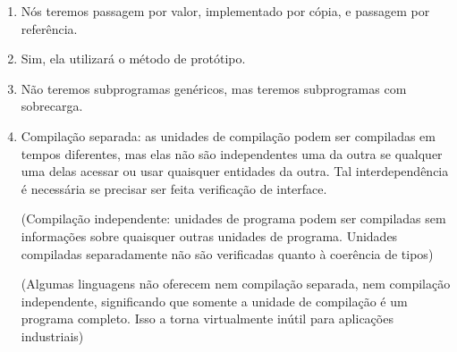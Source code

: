 \documentclass[12pt, a4paper]{article}
\begin{document}
\begin{enumerate}
        \item
        Nós teremos passagem por valor, implementado por cópia, e passagem por referência.

        \item
        Sim, ela utilizará o método de protótipo.

        \item
        Não teremos subprogramas genéricos, mas teremos subprogramas com sobrecarga.

        \begin{comment}
            Com sobrecarga:
            int soma(int a, int b) {
                return a+b;
            }

            float soma(float a, float b) {
                return a+b;
            }

            int soma(String a, String b) {
                return a^b;
            }

            Final das contas, posso lembrar o nome de apenas uma função e fazer:

            soma(1, 2);
            soma(1.5, 2.5);
            soma(“teste”, “ ftw”);

            Sem sobrecarga:

            int somaInt(int a, int b) {
                return a+b;
            }

            float somaFloat(float a, float b) {
                return a+b;
            }

            int somaString(String a, String b) {
                return a^b;
            }
        \end{comment}

        \item
        Compilação separada: as unidades de compilação podem ser compiladas em
        tempos diferentes, mas elas não são independentes uma da outra se
        qualquer uma delas acessar ou usar quaisquer entidades da outra. Tal
        interdependência é necessária se precisar ser feita verificação de
        interface.

        (Compilação independente: unidades de programa podem ser compiladas sem
        informações sobre quaisquer outras unidades de programa. Unidades
        compiladas separadamente não são verificadas quanto à coerência de
        tipos)

        (Algumas linguagens não oferecem nem compilação separada, nem
        compilação independente, significando que somente a unidade de
        compilação é um programa completo. Isso a torna virtualmente inútil
        para aplicações industriais)


\end{enumerate}
\end{document}
